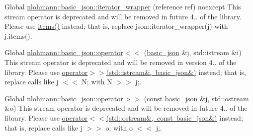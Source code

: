 
\begin{DoxyRefList}
\item[Global \mbox{\hyperlink{classnlohmann_1_1basic__json_a0a8051760196ac813fd5eb3c8d5a2976}{nlohmann::basic\+\_\+json::iterator\+\_\+wrapper}} (reference ref) noexcept]\label{deprecated__deprecated000001}%
%
This stream operator is deprecated and will be removed in future 4.. of the library. Please use \mbox{\hyperlink{classnlohmann_1_1basic__json_a5961446010dfc494e0c247b4e9026977}{items()}} instead; that is, replace {\ttfamily json\+::iterator\+\_\+wrapper(j)} with {\ttfamily j.\+items()}.  
\item[Global \mbox{\hyperlink{classnlohmann_1_1basic__json_a60ca396028b8d9714c6e10efbf475af6}{nlohmann::basic\+\_\+json::operator$<$$<$}} (\mbox{\hyperlink{classnlohmann_1_1basic__json}{basic\+\_\+json}} \&j, std\+::istream \&i)]\label{deprecated__deprecated000003}%
%
This stream operator is deprecated and will be removed in version 4.. of the library. Please use \mbox{\hyperlink{classnlohmann_1_1basic__json_aaf363408931d76472ded14017e59c9e8}{operator$>$$>$(std\+::istream\&, basic\+\_\+json\&)}} instead; that is, replace calls like {\ttfamily j $<$$<$ N;} with {\ttfamily N $>$$>$ j;}.  
\item[Global \mbox{\hyperlink{classnlohmann_1_1basic__json_a34d6a60dd99e9f33b8273a1c8db5669b}{nlohmann::basic\+\_\+json::operator$>$$>$}} (const \mbox{\hyperlink{classnlohmann_1_1basic__json}{basic\+\_\+json}} \&j, std\+::ostream \&o)]\label{deprecated__deprecated000002}%
%
This stream operator is deprecated and will be removed in future 4.. of the library. Please use \mbox{\hyperlink{classnlohmann_1_1basic__json_a5e34c5435e557d0bf666bd7311211405}{operator$<$$<$(std\+::ostream\&, const basic\+\_\+json\&)}} instead; that is, replace calls like {\ttfamily j $>$$>$ o;} with {\ttfamily o $<$$<$ j;}. 
\end{DoxyRefList}